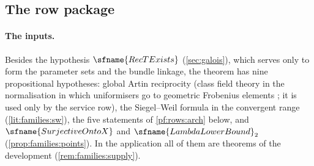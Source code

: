 \subsection{The row package}\label{sec:pf:rows:main}

\paragraph{The inputs.}
Besides the hypothesis $\sfname{RecTExists}$ (\cref{sec:galois}), which serves only to form the parameter sets and the
bundle linkage, the theorem has nine propositional hypotheses: global Artin reciprocity (class field theory in the
normalisation in which uniformisers go to geometric Frobenius elements \cite{ArtinTate1967,Tate1967gcft,Neukirch1999};
it is used only by the service row), the Siegel--Weil formula in the convergent range (\cref{lit:families:sw}), the five
statements of \cref{pf:rows:arch} below, and $\sfname{SurjectiveOntoX}$ and $\sfname{LambdaLowerBound}_2$
(\cref{prop:families:points}). In the application all of them are theorems of the development
(\cref{rem:families:supply}).

